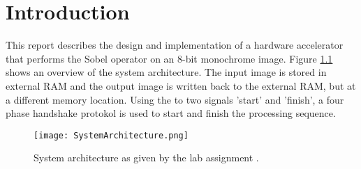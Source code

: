 \chapter{Introduction}

This report describes the design and implementation of a hardware accelerator that performs the Sobel operator on an 8-bit monochrome image. Figure \ref{fig:SysArch} shows an overview of the system architecture. The input image is stored in external RAM and the output image is written back to the external RAM, but at a different memory location. Using the to two signals 'start' and 'finish', a four phase handshake protokol is used to start and finish the processing sequence.

\begin{figure}[H]
	\centering
	\texttt{[image: SystemArchitecture.png]}
	\caption{System architecture as given by the lab assignment \cite{Sparsoe2014}.}
	\label{fig:SysArch}
\end{figure}

